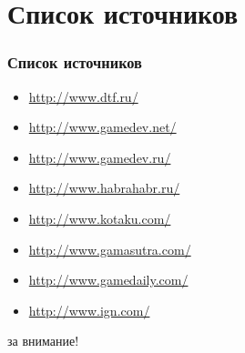 \section{Список источников}
\begin{frame}
    \frametitle{Список источников}
    \begin{itemize}
        \item \url{http://www.dtf.ru/}
        \item \url{http://www.gamedev.net/}
        \item \url{http://www.gamedev.ru/}
        \item \url{http://www.habrahabr.ru/}
        \item \url{http://www.kotaku.com/}
        \item \url{http://www.gamasutra.com/}
        \item \url{http://www.gamedaily.com/}
        \item \url{http://www.ign.com/}
    \end{itemize}
\end{frame}

\begin{frame}
    \Huge{} за внимание!
\end{frame}